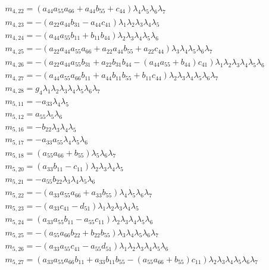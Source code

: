 \documentclass{article}
\begin{document}
\begin{align*}
&m_{4,22}={\left(a_{44} a_{55} a_{66} + a_{44} b_{55} + c_{44}\right)} \lambda_{4} \lambda_{5} \lambda_{6} \lambda_{7}\\
&m_{4,23}=-{\left(a_{22} a_{44} b_{31} - a_{44} c_{41}\right)} \lambda_{1} \lambda_{2} \lambda_{3} \lambda_{4} \lambda_{5}\\
&m_{4,24}=-{\left(a_{44} a_{55} b_{11} + b_{11} b_{44}\right)} \lambda_{2} \lambda_{3} \lambda_{4} \lambda_{5} \lambda_{6}\\
&m_{4,25}=-{\left(a_{22} a_{44} a_{55} a_{66} + a_{22} a_{44} b_{55} + a_{22} c_{44}\right)} \lambda_{3} \lambda_{4} \lambda_{5} \lambda_{6} \lambda_{7}\\
&m_{4,26}=-{\left(a_{22} a_{44} a_{55} b_{31} + a_{22} b_{31} b_{44} - {\left(a_{44} a_{55} + b_{44}\right)} c_{41}\right)} \lambda_{1} \lambda_{2} \lambda_{3} \lambda_{4} \lambda_{5} \lambda_{6}\\
&m_{4,27}=-{\left(a_{44} a_{55} a_{66} b_{11} + a_{44} b_{11} b_{55} + b_{11} c_{44}\right)} \lambda_{2} \lambda_{3} \lambda_{4} \lambda_{5} \lambda_{6} \lambda_{7}\\
&m_{4,28}=g_{4} \lambda_{1} \lambda_{2} \lambda_{3} \lambda_{4} \lambda_{5} \lambda_{6} \lambda_{7}\\
&m_{5,11}=-a_{33} \lambda_{4} \lambda_{5}\\
&m_{5,12}=a_{55} \lambda_{5} \lambda_{6}\\
&m_{5,16}=-b_{22} \lambda_{3} \lambda_{4} \lambda_{5}\\
&m_{5,17}=-a_{33} a_{55} \lambda_{4} \lambda_{5} \lambda_{6}\\
&m_{5,18}={\left(a_{55} a_{66} + b_{55}\right)} \lambda_{5} \lambda_{6} \lambda_{7}\\
&m_{5,20}={\left(a_{33} b_{11} - c_{11}\right)} \lambda_{2} \lambda_{3} \lambda_{4} \lambda_{5}\\
&m_{5,21}=-a_{55} b_{22} \lambda_{3} \lambda_{4} \lambda_{5} \lambda_{6}\\
&m_{5,22}=-{\left(a_{33} a_{55} a_{66} + a_{33} b_{55}\right)} \lambda_{4} \lambda_{5} \lambda_{6} \lambda_{7}\\
&m_{5,23}=-{\left(a_{33} c_{41} - d_{51}\right)} \lambda_{1} \lambda_{2} \lambda_{3} \lambda_{4} \lambda_{5}\\
&m_{5,24}={\left(a_{33} a_{55} b_{11} - a_{55} c_{11}\right)} \lambda_{2} \lambda_{3} \lambda_{4} \lambda_{5} \lambda_{6}\\
&m_{5,25}=-{\left(a_{55} a_{66} b_{22} + b_{22} b_{55}\right)} \lambda_{3} \lambda_{4} \lambda_{5} \lambda_{6} \lambda_{7}\\
&m_{5,26}=-{\left(a_{33} a_{55} c_{41} - a_{55} d_{51}\right)} \lambda_{1} \lambda_{2} \lambda_{3} \lambda_{4} \lambda_{5} \lambda_{6}\\
&m_{5,27}={\left(a_{33} a_{55} a_{66} b_{11} + a_{33} b_{11} b_{55} - {\left(a_{55} a_{66} + b_{55}\right)} c_{11}\right)} \lambda_{2} \lambda_{3} \lambda_{4} \lambda_{5} \lambda_{6} \lambda_{7}\\
\end{align*}
\end{document}

